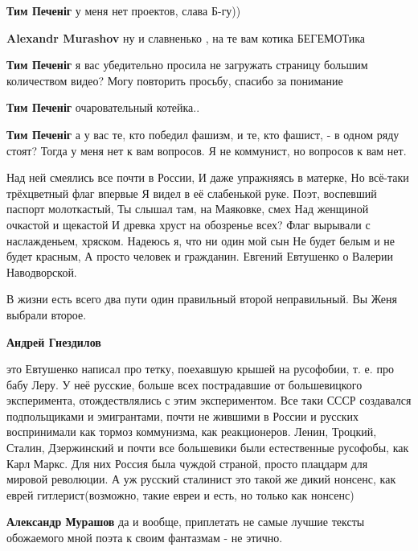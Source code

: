 \begin{itemize}
\begin{itemize}
\textbf{Тим Печеніг} у меня нет проектов, слава Б-гу))

\textbf{Alexandr Murashov} ну и славненько , на те вам котика БЕГЕМОТика

\textbf{Тим Печеніг} я вас убедительно просила не загружать страницу большим количеством видео? Могу повторить просьбу, спасибо за понимание

\textbf{Тим Печеніг} очаровательный котейка..


\textbf{Тим Печеніг} а у вас те, кто победил фашизм, и те, кто фашист, - в одном ряду стоят? Тогда у меня нет к вам вопросов. Я не коммунист, но вопросов к вам нет.

\end{itemize} %


\obeycr
Над ней смеялись все почти в России,
И даже упражняясь в матерке,
Но всё-таки трёхцветный флаг впервые
Я видел в её слабенькой руке.
Поэт, воспевший паспорт молоткастый,
Ты слышал там, на Маяковке, смех
Над женщиной очкастой и щекастой
И древка хруст на обозренье всех?
Флаг вырывали с наслажденьем, хряском.
Надеюсь я, что ни один мой сын
Не будет белым и не будет красным,
А просто человек и гражданин.
Евгений Евтушенко о Валерии Наводворской.
\restorecr

В жизни есть всего два пути один правильный второй неправильный. Вы Женя выбрали второе.

\begin{itemize} %
\textbf{Андрей Гнездилов} 

это Евтушенко написал про тетку, поехавшую крышей на русофобии, т. е. про бабу
Леру. У неё русские, больше всех пострадавшие от большевицкого
эксперимента, отождествлялись с этим экспериментом. Все таки СССР создавался
подпольщиками и эмигрантами, почти не жившими в России и русских воспринимали
как тормоз коммунизма, как реакционеров. Ленин, Троцкий, Сталин, Дзержинский и
почти все большевики были естественные русофобы, как Карл Маркс. Для них Россия
была чуждой страной, просто плацдарм для мировой революции. А уж русский
сталинист это такой же дикий нонсенс, как еврей гитлерист(возможно, такие евреи и
есть, но только как нонсенс)

\textbf{Александр Мурашов} да и вообще, приплетать не самые лучшие тексты обожаемого мной поэта к своим фантазмам - не этично.

\end{itemize} %

\end{itemize} %
